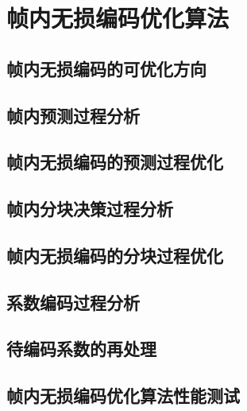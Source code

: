 \chapter{帧内无损编码优化算法}
\label{cha:c3}

\section{帧内无损编码的可优化方向}

\section{帧内预测过程分析}

\section{帧内无损编码的预测过程优化}

\section{帧内分块决策过程分析}

\section{帧内无损编码的分块过程优化}

\section{系数编码过程分析}

\section{待编码系数的再处理}

\section{帧内无损编码优化算法性能测试}